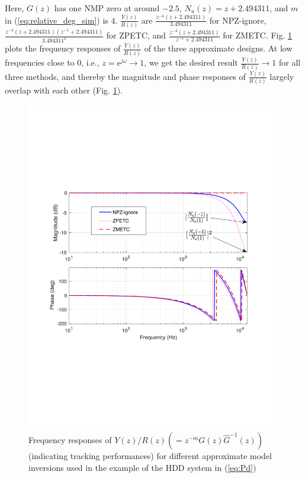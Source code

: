 \documentclass [11pt, proquest] {uwthesis}[2020/02/24]
\begin{document}
\noindent Here, $G(z)$ has one NMP zero at around $-2.5$, $N_{u}(z)=z+2.494311$,
and $m$ in (\ref{eq:relative_deg_sim}) is 4. $\frac{Y(z)}{R(z)}$
are $\frac{z^{-4}(z+2.494311)}{3.494311}$ for NPZ-ignore, $\frac{z^{-4}(z+2.494311)(z^{-1}+2.494311)}{3.494311^{2}}$
for ZPETC, and $\frac{z^{-4}(z+2.494311)}{z^{-1}+2.494311}$ for ZMETC.
Fig. \ref{fig:Nominal-model-inversion-1} plots the frequency responses
of $\frac{Y(z)}{R(z)}$ of the three approximate designs. At low
frequencies close to 0, i.e., $z=\text{e}^{j\omega}\rightarrow1$,
we get the desired result $\frac{Y(z)}{R(z)}\rightarrow1$ for all
three methods, and thereby the magnitude and phase responses of $\frac{Y(z)}{R(z)}$
largely overlap with each other (Fig. \ref{fig:Nominal-model-inversion-1}).
\begin{figure}[!ht]
\begin{centering}
\includegraphics[width=13cm]{Model-inversion/approximatemethods}
\par\end{centering}
\caption{\label{fig:Nominal-model-inversion-1}Frequency responses of $Y(z)/R(z)(=z^{-m}G(z)\hat{G}^{-1}(z))$
(indicating tracking performances) for different approximate model
inversions used in the example of the HDD system in (\ref{eq:Pd})}
\end{figure}
\end{document}
